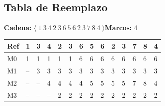 \documentclass[12pt,a4paper]{article}
\begin{document}
\subsection{Tabla de Reemplazo}
\textbf{Cadena:} $\langle\;1\ 3\ 4\ 2\ 3\ 6\ 5\ 6\ 2\ 3\ 7\ 8\ 4\;\rangle$\quad\textbf{Marcos:} 4
\medskip
\begin{center}
\scriptsize\setlength{\tabcolsep}{2pt}
\begin{tabular}{|l|>{\centering\arraybackslash}p{0.4cm}|>{\centering\arraybackslash}p{0.4cm}|>{\centering\arraybackslash}p{0.4cm}|>{\centering\arraybackslash}p{0.4cm}|>{\centering\arraybackslash}p{0.4cm}|>{\centering\arraybackslash}p{0.4cm}|>{\centering\arraybackslash}p{0.4cm}|>{\centering\arraybackslash}p{0.4cm}|>{\centering\arraybackslash}p{0.4cm}|>{\centering\arraybackslash}p{0.4cm}|>{\centering\arraybackslash}p{0.4cm}|>{\centering\arraybackslash}p{0.4cm}|>{\centering\arraybackslash}p{0.4cm}|}
\hline
\textbf{Ref} & \cellcolor{faultcol!50}\textbf{1} & \cellcolor{faultcol!50}\textbf{3} & \cellcolor{faultcol!50}\textbf{4} & \cellcolor{faultcol!50}\textbf{2} & \cellcolor{hitcol!40}\textbf{3} & \cellcolor{faultcol!50}\textbf{6} & \cellcolor{faultcol!50}\textbf{5} & \cellcolor{hitcol!40}\textbf{6} & \cellcolor{hitcol!40}\textbf{2} & \cellcolor{hitcol!40}\textbf{3} & \cellcolor{faultcol!50}\textbf{7} & \cellcolor{faultcol!50}\textbf{8} & \cellcolor{faultcol!50}\textbf{4} \\
\hline
M0 & \cellcolor{pB!40}1 & \cellcolor{pB!40}1 & \cellcolor{pB!40}1 & \cellcolor{pB!40}1 & \cellcolor{pB!40}1 & \cellcolor{pG!40}6 & \cellcolor{pG!40}6 & \cellcolor{pG!40}6 & \cellcolor{pG!40}6 & \cellcolor{pG!40}6 & \cellcolor{pG!40}6 & \cellcolor{pG!40}6 & \cellcolor{pG!40}6 \\
M1 & {\color{gray!60}--} & \cellcolor{pD!40}3 & \cellcolor{pD!40}3 & \cellcolor{pD!40}3 & \cellcolor{pD!40}3 & \cellcolor{pD!40}3 & \cellcolor{pD!40}3 & \cellcolor{pD!40}3 & \cellcolor{pD!40}3 & \cellcolor{pD!40}3 & \cellcolor{pD!40}3 & \cellcolor{pD!40}3 & \cellcolor{pD!40}3 \\
M2 & {\color{gray!60}--} & {\color{gray!60}--} & \cellcolor{pE!40}4 & \cellcolor{pE!40}4 & \cellcolor{pE!40}4 & \cellcolor{pE!40}4 & \cellcolor{pF!40}5 & \cellcolor{pF!40}5 & \cellcolor{pF!40}5 & \cellcolor{pF!40}5 & \cellcolor{pH!40}7 & \cellcolor{pI!40}8 & \cellcolor{pE!40}4 \\
M3 & {\color{gray!60}--} & {\color{gray!60}--} & {\color{gray!60}--} & \cellcolor{pC!40}2 & \cellcolor{pC!40}2 & \cellcolor{pC!40}2 & \cellcolor{pC!40}2 & \cellcolor{pC!40}2 & \cellcolor{pC!40}2 & \cellcolor{pC!40}2 & \cellcolor{pC!40}2 & \cellcolor{pC!40}2 & \cellcolor{pC!40}2 \\

\end{tabular}
\end{center}
\end{document}
